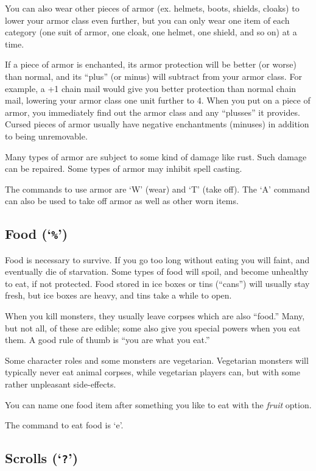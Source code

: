 \nd You can also wear other pieces of armor (ex. helmets, boots,
shields, cloaks)
to lower your armor class even further, but you can only wear one item
of each category (one suit of armor, one cloak, one helmet, one
shield, and so on) at a time.

If a piece of armor is enchanted, its armor protection will be better
(or worse) than normal, and its ``plus'' (or minus) will subtract from
your armor class.  For example, a +1 chain mail would give you
better protection than normal chain mail, lowering your armor class one
unit further to 4.  When you put on a piece of armor, you immediately
find out the armor class and any ``plusses'' it provides.  Cursed
pieces of armor usually have negative enchantments (minuses) in
addition to being unremovable.

Many types of armor are subject to some kind of damage like rust.  Such
damage can be repaired.  Some types of armor may inhibit spell casting.

The commands to use armor are `W' (wear) and `T' (take off).
The `A' command can also be used to take off armor as well as other
worn items.
\subsection{Food (`{\tt \%}')}

Food is necessary to survive.  If you go too long without eating you
will faint, and eventually die of starvation.  Some types of food will
spoil, and become unhealthy to eat, if not protected.  Food stored in
ice boxes or tins (``cans'') will usually stay fresh, but
ice boxes are heavy, and tins take a while to open.

When you kill monsters, they usually leave corpses which are also
``food.''  Many, but not all, of these are edible; some also give you
special powers when you eat them.  A good rule of thumb is ``you are
what you eat.''

Some character roles and some monsters are vegetarian.  Vegetarian monsters
will typically never eat animal corpses, while vegetarian players can,
but with some rather unpleasant side-effects.

You can name one food item after something you like to eat with the
{\it fruit }
option.

The command to eat food is `e'.
\subsection*{Scrolls (`{\tt ?}')}

